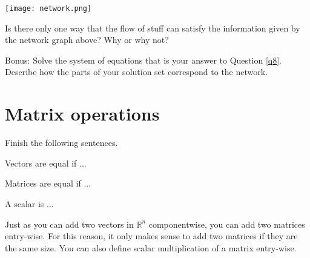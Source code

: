 \texttt{[image: network.png]}
\eq

\bq Is there only one way that the flow of stuff can satisfy the information given by the network graph above? Why or why not?
\eq

\bq Bonus: Solve the system of equations that is your answer to Question \ref{q8}. Describe how the parts of your solution set correspond to the network.
\eq

\section{Matrix operations}\label{mo}
\bq Finish the following sentences.
\be
\item Vectors are equal if ...
\item Matrices are equal if ...
\item A scalar is ...
\ee
\eq

Just as you can add two vectors in $\mathbb{R}^n$ componentwise, you can add two matrices entry-wise. For this reason, it only makes sense to add two matrices if they are the same size. You can also define scalar multiplication of a matrix entry-wise.
\begin{annotation}
\end{annotation}

